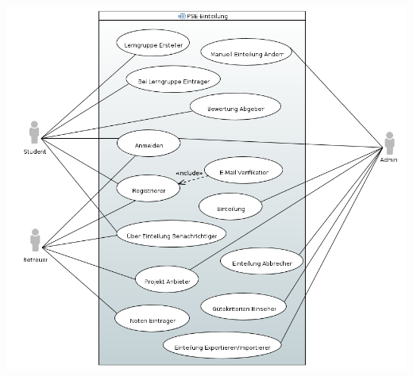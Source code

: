\documentclass[parskip=full]{scrartcl}
\begin{document}
\includegraphics[width=\linewidth]{diagramme_pflichtenheft/UseCase_Diagram.PNG}
\pagebreak
\end{document}
